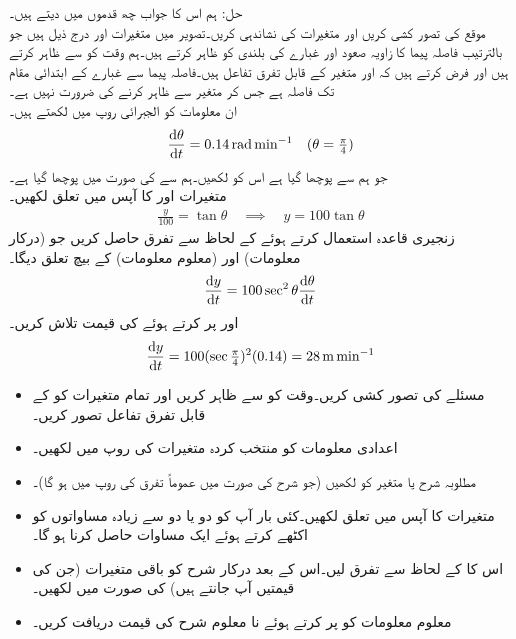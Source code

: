 حل:\quad
ہم اس کا جواب چھ قدموں میں دیتے ہیں۔\\
\quad 
موقع کی تصور کشی کریں اور متغیرات کی نشاندہی کریں۔تصویر میں متغیرات  اور  درج ذیل ہیں جو بالترتیب فاصلہ پیما کا زاویہ صعود اور غبارے کی بلندی کو ظاہر کرتے ہیں۔ہم وقت کو  سے ظاہر کرتے ہیں اور فرض کرتے ہیں کہ  اور  متغیر  کے قابل تفرق تفاعل ہیں۔فاصلہ پیما سے غبارے کے ابتدائی مقام تک فاصلہ  ہے جس کر متغیر سے ظاہر کرنے کی ضرورت نہیں ہے۔\\
\quad
ان معلومات کو الجبرائی روپ میں لکھتے ہیں۔
\begin{align*}
\frac{\dif \theta}{\dif t}=\SI{0.14}{\radian\per\minute}&& (\theta=\tfrac{\pi}{4})
\end{align*}
 \quad
جو ہم سے پوچھا گیا ہے اس کو لکھیں۔ہم سے  کی صورت میں  پوچھا گیا ہے۔\\
\quad
متغیرات   اور  کا آپس میں تعلق لکھیں۔
\begin{align*}
\frac{y}{100}=\tan\theta\quad \implies \quad y=100\tan\theta
\end{align*}
\quad
زنجیری قاعدہ استعمال کرتے ہوئے  کے لحاظ سے تفرق حاصل کریں جو  (درکار معلومات) اور  (معلوم معلومات)  کے بیچ تعلق دیگا۔
\begin{align*}
\frac{\dif y}{\dif t}=100\sec^2\theta\frac{\dif \theta}{\dif t}
\end{align*}
\quad
{} اور  پر کرتے ہوئے  کی قیمت تلاش کریں۔
\begin{align*}
\frac{\dif y}{\dif t}=100(\sec\tfrac{\pi}{4})^2(0.14)=\SI{28}{\meter\per\minute}
\end{align*}

\begin{itemize}

\item
مسئلے کی تصور کشی کریں۔وقت کو  سے ظاہر کریں اور تمام متغیرات کو  کے قابل تفرق تفاعل تصور کریں۔
\item
اعدادی معلومات کو منتخب کردہ متغیرات کی روپ میں لکھیں۔
\item
مطلوبہ شرح یا متغیر کو لکھیں (جو شرح کی صورت میں عموماً تفرق کی روپ میں ہو گا)۔
\item
متغیرات کا آپس میں تعلق لکھیں۔کئی بار آپ کو دو یا دو سے زیادہ مساواتوں کو اکٹھے کرتے ہوئے ایک مساوات حاصل کرنا ہو گا۔
\item
اس کا  کے لحاظ سے تفرق لیں۔اس کے بعد درکار شرح کو باقی متغیرات (جن کی قیمتیں آپ جانتے ہیں) کی صورت میں لکھیں۔
\item
معلوم معلومات کو پر کرتے ہوئے نا معلوم شرح کی قیمت دریافت کریں۔
\end{itemize}


